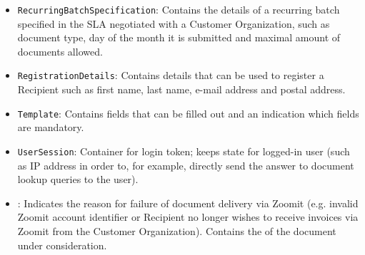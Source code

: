 \begin{itemize}
	\item \texttt{RecurringBatchSpecification}: Contains the details of a recurring batch specified in the SLA negotiated with a Customer Organization, such as document type, day of the month it is submitted and maximal amount of documents allowed.
    \item \texttt{RegistrationDetails}: Contains details that can be used to register a Recipient such as first name, last name, e-mail address and postal address.
    \item \texttt{Template}: Contains fields that can be filled out and an indication which fields are mandatory.
    \item \texttt{UserSession}: Container for login token; keeps state for logged-in user (such as IP address in order to, for example, directly send the answer to document lookup queries to the user).
	\item {}: Indicates the reason for failure of document delivery via Zoomit (e.g. invalid Zoomit account identifier or Recipient no longer wishes to receive invoices via Zoomit from the Customer Organization). Contains the  of the document under consideration.
\end{itemize}